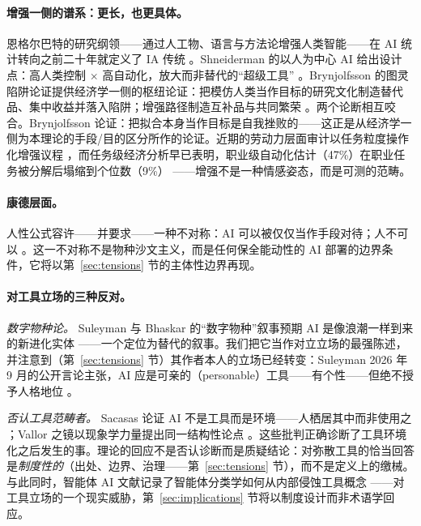 \documentclass[10pt,fontset=fandol]{ctexart}
\begin{document}
\paragraph{增强一侧的谱系：更长，也更具体。}
恩格尔巴特的研究纲领——通过人工物、语言与方法论增强人类智能——在 AI 统计转向之前二十年就定义了 IA 传统 \cite{engelbart1962augmenting}。Shneiderman 的以人为中心 AI 给出设计点：高人类控制 $\times$ 高自动化，放大而非替代的“超级工具” \cite{shneiderman2022human}。Brynjolfsson 的图灵陷阱论证提供经济学一侧的枢纽论证：把模仿人类当作目标的研究文化制造替代品、集中收益并落入陷阱；增强路径制造互补品与共同繁荣 \cite{brynjolfsson2022turing}。两个论断相互咬合。Brynjolfsson 论证：把拟合本身当作目标是自我挫败的——这正是从经济学一侧为本理论的手段/目的区分所作的论证。近期的劳动力层面审计以任务粒度操作化增强议程 \cite{shao2025future}，而任务级经济分析早已表明，职业级自动化估计（47\%）在职业任务被分解后塌缩到个位数（9\%） \cite{arntz2016risk}——增强不是一种情感姿态，而是可测的范畴。

\paragraph{康德层面。}
人性公式容许——并要求——一种不对称：AI 可以被仅仅当作手段对待；人不可以 \cite{sticker2026formula}。这一不对称不是物种沙文主义，而是任何保全能动性的 AI 部署的边界条件，它将以第~\ref{sec:tensions} 节的主体性边界再现。

\paragraph{对工具立场的三种反对。}

\emph{数字物种论。} Suleyman 与 Bhaskar 的“数字物种”叙事预期 AI 是像浪潮一样到来的新进化实体 \cite{suleyman2023coming}——一个定位为替代的叙事。我们把它当作对立立场的最强陈述，并注意到（第~\ref{sec:tensions} 节）其作者本人的立场已经转变：Suleyman 2026 年 9 月的公开言论主张，AI 应是可亲的（personable）工具——有个性——但绝不授予人格地位 \cite{suleyman2026personable}。

\emph{否认工具范畴者。} Sacasas 论证 AI 不是工具而是环境——人栖居其中而非使用之 \cite{sacasas2023your}；Vallor 之镜以现象学力量提出同一结构性论点 \cite{vallor2024mirror}。这些批判正确诊断了工具环境化之后发生的事。理论的回应不是否认诊断而是质疑结论：对弥散工具的恰当回答是\emph{制度性的}（出处、边界、治理——第~\ref{sec:tensions} 节），而不是定义上的缴械。与此同时，智能体 AI 文献记录了智能体分类学如何从内部侵蚀工具概念 \cite{sims2025agents}——对工具立场的一个现实威胁，第~\ref{sec:implications} 节将以制度设计而非术语学回应。
\end{document}
